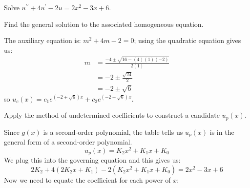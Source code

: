 \vspace{0.5cm}

 Solve $u^{\prime \prime}+4u^{\prime}-2u = 2x^2 - 3x + 6$.

\vspace{0.25cm}
 Find the general solution to the associated homogeneous equation.

\vspace{0.25cm}

\noindent The auxiliary equation is: $m^2 + 4m-2=0$; using the quadratic equation gives us: 
\begin{align*}
m &= \frac{-4 \pm \sqrt{16 - (4)(1)(-2)}}{2(1)} \\
&= -2 \pm \frac{\sqrt{24}}{2} \\
&= -2 \pm \sqrt{6}
\end{align*}
so $u_c(x) = c_1e^{(-2+\sqrt{6})x}+c_2e^{(-2-\sqrt{6})x}$.

\vspace{3.0cm}
 Apply the method of undetermined coefficients to construct a candidate $u_p(x)$.

\vspace{0.25cm}

\noindent Since $g(x)$ is a second-order polynomial, the table tells us $u_p(x)$ is in the general form of a second-order polynomial.
$$u_p(x) = K_2x^2+K_1x+K_0$$
We plug this into the governing equation and this gives us:
\begin{equation*}
2K_2 + 4(2K_2x+K_1) - 2(K_2x^2+K_1x+K_0) = 2x^2-3x+6
\end{equation*}
Now we need to equate the coefficient for each power of $x$:

